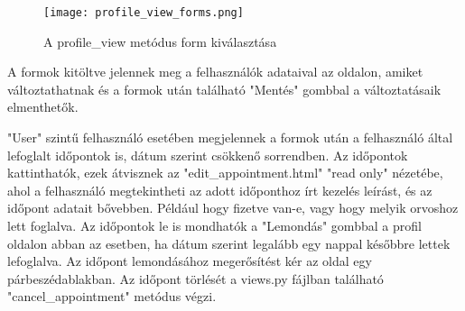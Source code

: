\begin{figure}[H]
	\caption{A profile\_view metódus form kiválasztása}
	\label{fig:profileviewformkivalasztas}
	\centering
	\texttt{[image: profile\_view\_forms.png]}
\end{figure}

A formok kitöltve jelennek meg a felhasználók adataival az oldalon, amiket változtathatnak és a formok után található "Mentés" gombbal a változtatásaik elmenthetők.

"User" szintű felhasználó esetében megjelennek a formok után a felhasználó által lefoglalt időpontok is, dátum szerint csökkenő sorrendben. Az időpontok kattinthatók, ezek átvisznek az "edit\_appointment.html" "read only" nézetébe, ahol a felhasználó megtekintheti az adott időponthoz írt kezelés leírást, és az időpont adatait bővebben. Például hogy fizetve van-e, vagy hogy melyik orvoshoz lett foglalva. Az időpontok le is mondhatók a "Lemondás" gombbal a profil oldalon abban az esetben, ha dátum szerint legalább egy nappal későbbre lettek lefoglalva. Az időpont lemondásához megerősítést kér az oldal egy párbeszédablakban. Az időpont törlését a views.py fájlban található "cancel\_appointment" metódus végzi.
